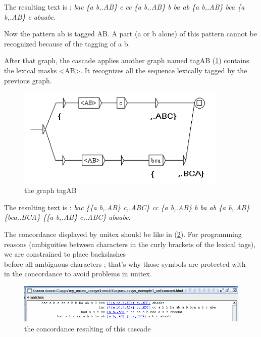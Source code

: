 \bigskip
\noindent The resulting text is : \emph{bac \{a b,.AB\} c cc \{a b,.AB\} b ba ab \{a b,.AB\} bca \{a b,.AB\} c abaabc}.

\bigskip
\noindent Now the pattern ab is tagged AB. A part (a or b alone) of this pattern cannot be recognized because of the tagging of a b. 

\bigskip
\noindent After that graph, the cascade applies another graph named tagAB (\ref{fig13-06}) contains the lexical masks <AB>. It recognizes all the sequence lexically tagged by the previous graph.

\begin{figure}[!htb]
  \centering
  \includegraphics[width=10cm]{resources/img/fig13-06.png}
  \caption{the graph tagAB}
  \label{fig13-06}
\end{figure}

\bigskip
\noindent The resulting text is : \emph{bac \{\{a b,.AB\} c,.ABC\} cc \{a b,.AB\} b ba ab \{a b,.AB\} \{bca,.BCA\} \{\{a b,.AB\} c,.ABC\} abaabc}.


\bigskip
\noindent The concordance displayed by unitex should be like in (\ref{fig13-07}). For programming reasons (ambiguities between characters in the curly brackets of the lexical tags), we are constrained to place backslashes \\ before all ambiguous characters ; that's why those symbols are protected with \\ in the concordance to avoid problems in unitex. 

\begin{figure}[!htb]
  \centering
  \includegraphics[width=15cm]{resources/img/fig13-07.png}
  \caption{the concordance resulting of this cascade}
  \label{fig13-07}
\end{figure}

